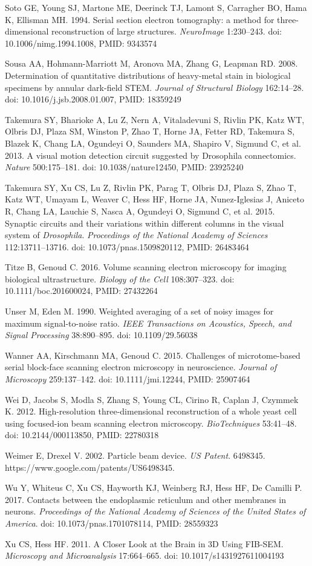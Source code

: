 \documentclass{article}
\begin{document}
\begin{hangpars}
Soto GE, Young SJ, Martone ME, Deerinck TJ, Lamont S, Carragher BO, Hama K, Ellisman MH. 1994. Serial section electron tomography: a method for three-dimensional reconstruction of large structures. \emph{NeuroImage} 1:230–243. doi: 10.1006/nimg.1994.1008, PMID: 9343574

Sousa AA, Hohmann-Marriott M, Aronova MA, Zhang G, Leapman RD. 2008. Determination of quantitative distributions of heavy-metal stain in biological specimens by annular dark-field STEM. \emph{Journal of Structural Biology} 162:14–28. doi: 10.1016/j.jsb.2008.01.007, PMID: 18359249

Takemura SY, Bharioke A, Lu Z, Nern A, Vitaladevuni S, Rivlin PK, Katz WT, Olbris DJ, Plaza SM, Winston P, Zhao T, Horne JA, Fetter RD, Takemura S, Blazek K, Chang LA, Ogundeyi O, Saunders MA, Shapiro V, Sigmund C, et al. 2013. A visual motion detection circuit suggested by Drosophila connectomics. \emph{Nature} 500:175–181. doi: 10.1038/nature12450, PMID: 23925240

Takemura SY, Xu CS, Lu Z, Rivlin PK, Parag T, Olbris DJ, Plaza S, Zhao T, Katz WT, Umayam L, Weaver C, Hess HF, Horne JA, Nunez-Iglesias J, Aniceto R, Chang LA, Lauchie S, Nasca A, Ogundeyi O, Sigmund C, et al. 2015. Synaptic circuits and their variations within different columns in the visual system of \emph{Drosophila}. \emph{Proceedings of the National Academy of Sciences} 112:13711–13716. doi: 10.1073/pnas.1509820112, PMID: 26483464

Titze B, Genoud C. 2016. Volume scanning electron microscopy for imaging biological ultrastructure. \emph{Biology of the Cell} 108:307–323. doi: 10.1111/boc.201600024, PMID: 27432264

Unser M, Eden M. 1990. Weighted averaging of a set of noisy images for maximum signal-to-noise ratio. \emph{IEEE Transactions on Acoustics, Speech, and Signal Processing} 38:890–895. doi: 10.1109/29.56038

Wanner AA, Kirschmann MA, Genoud C. 2015. Challenges of microtome-based serial block-face scanning electron microscopy in neuroscience. \emph{Journal of Microscopy} 259:137–142. doi: 10.1111/jmi.12244, PMID: 25907464

Wei D, Jacobs S, Modla S, Zhang S, Young CL, Cirino R, Caplan J, Czymmek K. 2012. High-resolution three-dimensional reconstruction of a whole yeast cell using focused-ion beam scanning electron microscopy. \emph{BioTechniques} 53:41–48. doi: 10.2144/000113850, PMID: 22780318

Weimer E, Drexel V. 2002. Particle beam device. \emph{US Patent}. 6498345. https://www.google.com/patents/US6498345.

Wu Y, Whiteus C, Xu CS, Hayworth KJ, Weinberg RJ, Hess HF, De Camilli P. 2017. Contacts between the endoplasmic reticulum and other membranes in neurons. \emph{Proceedings of the National Academy of Sciences of the United States of America}. doi: 10.1073/pnas.1701078114, PMID: 28559323

Xu CS, Hess HF. 2011. A Closer Look at the Brain in 3D Using FIB-SEM. \emph{Microscopy and Microanalysis} 17:664–665. doi: 10.1017/s1431927611004193
\end{hangpars}
\end{document}
